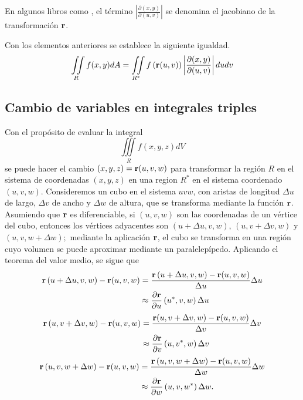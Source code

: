 En algunos libros como \cite{stewart_calculo_2018}, el término $\left\vert \frac{\partial\left(x,y\right)}{\partial(u,v)}\right\vert$
se denomina el jacobiano de la transformación ${\bf r}$. 

Con los elementos anteriores se establece la siguiente igualdad.
\begin{equation}
\iint\limits_{R}f(x,y) dA=\iint\limits_{R^{\ast }}f\left({\bf r}(u,v) \right) \left\vert \frac{\partial (x,y) }{\partial (u,v)}\right\vert dudv
\end{equation}

\subsection{Cambio de variables en integrales triples}
Con el propósito de evaluar la integral
\[\iiint\limits_{R}f(x,y,z) dV\]
se puede hacer el cambio $(x,y,z) ={\bf r}(u,v,w)$ para transformar la región $R$ en el sistema
de coordenadas $(x,y,z) $ en una region $R^{\ast }$ en el sistema coordenado  $(u,v,w) $.
Consideremos un cubo en el sistema $uvw$, con aristas de longitud $\Delta u$ de largo, $\Delta v$ de ancho y $\Delta w$ de altura, que se transforma mediante la función ${\bf r}$.
Asumiendo que ${\bf r}$ es diferenciable,
si $(u,v,w) $ son las coordenadas de un vértice del cubo, entonces los vértices
adyacentes son $\left( u+\Delta u,v,w\right) $, $\left( u,v+\Delta v,w\right)$ y $\left( u,v,w+\Delta w\right) ;$ mediante la aplicación ${\bf r}$, el cubo se transforma en una región cuyo volumen se puede aproximar mediante un \mbox{paralelepípedo}.
Aplicando el teorema del valor medio, se sigue que
\begin{align*}
{\bf r}\left( u+\Delta u,v,w\right) -{\bf r}(u,v,w) &= \frac{{\bf r}\left( u+\Delta u,v,w\right) -{\bf r}(u,v,w) }{\Delta u}\Delta u \\
&\approx\frac{\partial {\bf r}}{\partial u}\left( u^{\ast},v,w\right) \Delta u
\end{align*}
\begin{align*}
{\bf r}\left( u,v+\Delta v,w\right) -{\bf r}(u,v,w) &= \frac{{\bf r}(u,v+\Delta v,w)-{\bf r}(u,v,w)}{\Delta v}\Delta v \\
&\approx\frac{\partial{\bf r}}{\partial v}\left( u,v^{\ast},w\right)\Delta v
\end{align*}
\begin{align*}
{\bf r}\left( u,v,w+\Delta w\right) -{\bf r}(u,v,w) &= \frac{{\bf r}\left(
u,v,w+\Delta w\right) -{\bf r}(u,v,w)}{\Delta w}\Delta w \\
&\approx\frac{\partial {\bf r}}{\partial w}\left( u,v,w^{\ast}\right) \Delta w.
\end{align*}
